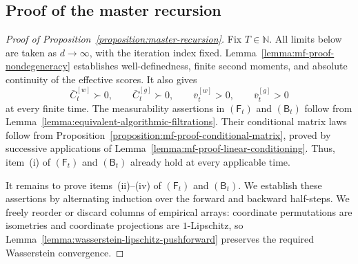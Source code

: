 \subsection{Proof of the master recursion}
\label{subsec:proof-master-rec}

\begin{proof}[Proof of Proposition~\ref{proposition:master-recursion}]
Fix $T\in\mathbb N$. All limits below are taken as $d\to\infty$,
with the iteration index fixed.
Lemma~\ref{lemma:mf-proof-nondegeneracy} establishes
well-definedness, finite second moments, and absolute continuity
of the effective scores. It also gives
\[
    \bar C_t^{[w]}\succ0,
    \qquad
    \bar C_t^{[g]}\succ0,
    \qquad
    \bar v_t^{[w]}>0,
    \qquad
    \bar v_t^{[g]}>0
\]
at every finite time.
The measurability assertions in $(\mathsf F_t)$ and $(\mathsf B_t)$
follow from
Lemma~\ref{lemma:equivalent-algorithmic-filtrations}.
Their conditional matrix laws follow from
Proposition~\ref{proposition:mf-proof-conditional-matrix},
proved by successive applications of
Lemma~\ref{lemma:mf-proof-linear-conditioning}.
Thus, item~(i) of $(\mathsf F_t)$ and $(\mathsf B_t)$
already hold at every applicable time.

It remains to prove items~(ii)--(iv) of $(\mathsf F_t)$ and $(\mathsf B_t)$. We establish these assertions by alternating induction over
the forward and backward half-steps.
We freely reorder or discard columns of empirical arrays:
coordinate permutations are isometries and coordinate projections
are $1$-Lipschitz, so
Lemma~\ref{lemma:wasserstein-lipschitz-pushforward}
preserves the required Wasserstein convergence.


\end{proof}
